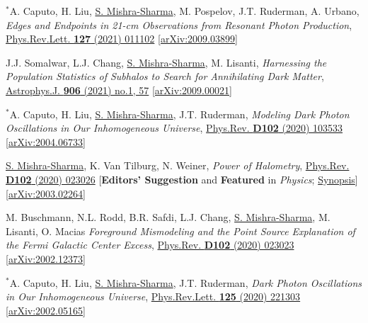 \documentclass[letterpaper,11pt]{article}
\newenvironment{packed_enumerate}[1][]{
\begin{etaremune}[#1]
  \setlength{\itemsep}{3.7pt}
  \setlength{\parskip}{0pt}
  \setlength{\parsep}{0pt}}{\end{etaremune}
}
\begin{document}
\begin{packed_enumerate}[start=38]
  \item $^*$A. Caputo, H. Liu, \underline{S. Mishra-Sharma}, M. Pospelov, J.T. Ruderman, A. Urbano, \emph{Edges and Endpoints in 21-cm Observations from Resonant Photon Production},  \href{https://journals.aps.org/prl/abstract/10.1103/PhysRevLett.127.011102}{Phys.Rev.Lett. \textbf{127} (2021) 011102}   \href{https://arxiv.org/abs/2009.03899}{[arXiv:2009.03899]}

  \item J.J. Somalwar, L.J. Chang, \underline{S. Mishra-Sharma}, M. Lisanti, \emph{Harnessing the Population Statistics of Subhalos to Search for Annihilating Dark Matter}, \href{https://iopscience.iop.org/article/10.3847/1538-4357/abc87d}{Astrophys.J. \textbf{906} (2021) no.1, 57} \href{https://arxiv.org/abs/2009.00021}{[arXiv:2009.00021]}

  \item $^*$A. Caputo, H. Liu, \underline{S. Mishra-Sharma}, J.T. Ruderman, \emph{Modeling Dark Photon Oscillations in Our Inhomogeneous Universe}, \href{https://journals.aps.org/prd/abstract/10.1103/PhysRevD.102.103533}{Phys.Rev. \textbf{D102} (2020) 103533}   \href{https://arxiv.org/abs/2004.06733}{[arXiv:2004.06733]}

  \item \underline{S. Mishra-Sharma}, K. Van Tilburg, N. Weiner, \emph{Power of Halometry}, \href{https://journals.aps.org/prd/abstract/10.1103/PhysRevD.102.023026}{Phys.Rev. \textbf{D102} (2020) 023026} [\textbf{Editors' Suggestion} and \textbf{Featured} in \emph{Physics}; \href{https://physics.aps.org/articles/v13/s98}{Synopsis}]  \href{https://arxiv.org/abs/2003.02264}{[arXiv:2003.02264]}

  \item M. Buschmann, N.L. Rodd, B.R. Safdi, L.J. Chang, \underline{S. Mishra-Sharma}, M. Lisanti, O. Macias \emph{Foreground Mismodeling and the Point Source Explanation of the Fermi Galactic Center Excess},  \href{https://journals.aps.org/prd/abstract/10.1103/PhysRevD.102.023023}{Phys.Rev. \textbf{D102} (2020) 023023} \href{https://arxiv.org/abs/2002.12373}{[arXiv:2002.12373]} 

  \item $^*$A. Caputo, H. Liu, \underline{S. Mishra-Sharma}, J.T. Ruderman, \emph{Dark Photon Oscillations in Our Inhomogeneous Universe}, \href{https://journals.aps.org/prl/abstract/10.1103/PhysRevLett.125.221303}{Phys.Rev.Lett. \textbf{125} (2020) 221303}  \href{https://arxiv.org/abs/2002.05165}{[arXiv:2002.05165]}


\end{packed_enumerate}
\end{document}
